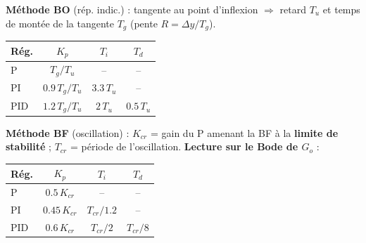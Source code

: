 \begin{tcolorbox}[colback=ch6teal!5,colframe=ch6teal!80!black,title={Ziegler-Nichols, gain critique $K_{cr}$ \& p\'eriode $T_{cr}$}]
\textbf{M\'ethode BO} (r\'ep. indic.) : tangente au point d'inflexion $\Rightarrow$ retard $T_u$ et temps de mont\'ee de la tangente $T_g$ (pente $R{=}\Delta y/T_g$).
\begin{center}
\renewcommand{\arraystretch}{1}
\scriptsize
\begin{tabular}{@{}lccc@{}}
\toprule
R\'eg. & $K_p$ & $T_i$ & $T_d$ \\
\midrule
P & $T_g/T_u$ & -- & -- \\
PI & $0.9\,T_g/T_u$ & $3.3\,T_u$ & -- \\
PID & $1.2\,T_g/T_u$ & $2\,T_u$ & $0.5\,T_u$ \\
\bottomrule
\end{tabular}
\end{center}
\textbf{M\'ethode BF} (oscillation) : $K_{cr}$ = gain du P amenant la BF \`a la \textbf{limite de stabilit\'e} ; $T_{cr}$ = p\'eriode de l'oscillation. \textbf{Lecture sur le Bode de $G_o$} :
\begin{center}
\renewcommand{\arraystretch}{1}
\scriptsize
\begin{tabular}{@{}lccc@{}}
\toprule
R\'eg. & $K_p$ & $T_i$ & $T_d$ \\
\midrule
P & $0.5\,K_{cr}$ & -- & -- \\
PI & $0.45\,K_{cr}$ & $T_{cr}/1.2$ & -- \\
PID & $0.6\,K_{cr}$ & $T_{cr}/2$ & $T_{cr}/8$ \\
\bottomrule
\end{tabular}
\end{center}
\end{tcolorbox}

